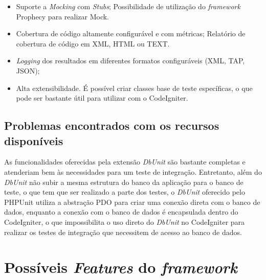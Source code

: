 \begin{itemize}
      \item Suporte a \textit{Mocking} com \textit{Stubs};
	\subitem Possibilidade de utilização do \textit{framework} Prophecy \footnotemark para realizar Mock.
	
      \item Cobertura de código altamente configurável e com métricas;
	 \subitem Relatório de cobertura de código em XML, HTML ou TEXT.
      
      \item \textit{Logging} dos resultados em diferentes formatos configuráveis (XML, TAP, JSON);
      
      \item Alta extensibilidade.
	\subitem É possível criar classes base de teste específicas, o que pode ser bastante útil para utilizar com o CodeIgniter.
    \end{itemize}
    
  \subsection{Problemas encontrados com os recursos disponíveis}
    
    As funcionalidades oferecidas pela extensão \textit{DbUnit} são bastante completas e atenderiam bem às necessidades
    para um teste de integração.
    Entretanto, além do \textit{DbUnit} não subir a mesma estrutura do banco da aplicação para o banco de teste,
    o que tem que ser realizado a parte dos testes, o \textit{DbUnit} oferecido pelo PHPUnit utiliza a abstração PDO para
    criar uma conexão direta com o banco de dados, enquanto a conexão com o banco de dados é encapsulada dentro do CodeIgniter,
    o que impossibilita o uso direto do \textit{DbUnit} no CodeIgniter para realizar os testes de integração que necessitem de
    acesso ao banco de dados.


\section{Possíveis \textit{Features} do \textit{framework}}

